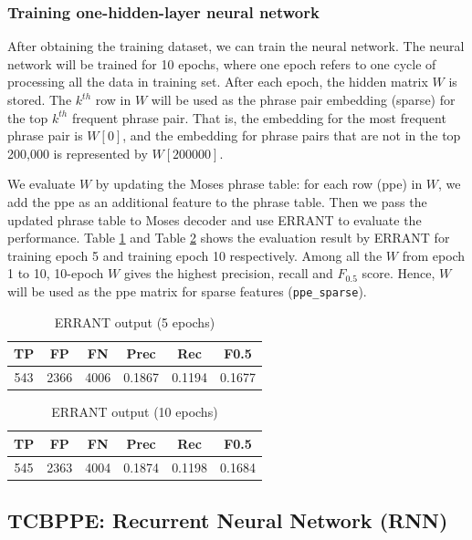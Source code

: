 \documentclass[12pt,a4paper,twoside,openright]{report}
\begin{document}
\subsubsection{Training one-hidden-layer neural network}

After obtaining the training dataset, we can train the neural network. The neural network will be trained for 10 epochs, where one epoch refers to one cycle of processing all the data in training set. After each epoch, the hidden matrix $W$ is stored. The $k^{th}$ row in $W$ will be used as the phrase pair embedding (sparse) for the top $k^{th}$ frequent phrase pair. That is, the embedding for the most frequent phrase pair is $W[0]$, and the embedding for phrase pairs that are not in the top 200,000 is represented by $W[200000]$.

We evaluate $W$ by updating the Moses phrase table: for each row (ppe) in $W$, we add the ppe as an additional feature to the phrase table. Then we pass the updated phrase table to Moses decoder and use ERRANT to evaluate the performance. Table \ref{table:sparse_5} and Table \ref{table:sparse_10} shows the evaluation result by ERRANT for training epoch 5 and training epoch 10 respectively. Among all the $W$ from epoch 1 to 10, 10-epoch $W$ gives the highest precision, recall and $F_{0.5}$ score. Hence, $W$ will be used as the ppe matrix for sparse features (\texttt{ppe\_sparse}).

\begin{table}[h!]
\centering
\begin{tabular}{ |c|c|c|c|c|c| } 
 \hline
 TP & FP & FN & Prec & Rec & F0.5 \\ [0.5ex] 
 \hline
 543 & 2366 & 4006 & 0.1867 & 0.1194 & 0.1677 \\ 
 \hline
\end{tabular}
\caption{ERRANT output (5 epochs)}
\label{table:sparse_5}
\end{table}

\begin{table}[h!]
\centering
\begin{tabular}{ |c|c|c|c|c|c| } 
 \hline
 TP & FP & FN & Prec & Rec & F0.5 \\ [0.5ex] 
 \hline
 545 & 2363 & 4004 & 0.1874 & 0.1198 & 0.1684 \\ 
 \hline
\end{tabular}
\caption{ERRANT output (10 epochs)}
\label{table:sparse_10}
\end{table}


\subsection{TCBPPE: Recurrent Neural Network (RNN)} \label{TCBPPE_rnn}
\end{document}
